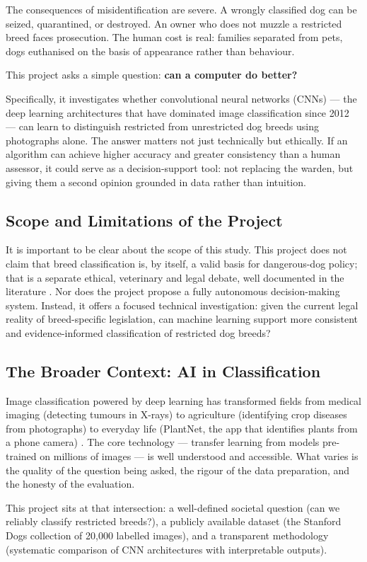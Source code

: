 The consequences of misidentification are severe. A wrongly classified dog can be seized, quarantined, or destroyed. An owner who does not muzzle a restricted breed faces prosecution. The human cost is real: families separated from pets, dogs euthanised on the basis of appearance rather than behaviour.

This project asks a simple question: \textbf{can a computer do better?}

Specifically, it investigates whether convolutional neural networks (CNNs) --- the deep learning architectures that have dominated image classification since 2012 --- can learn to distinguish restricted from unrestricted dog breeds using photographs alone. The answer matters not just technically but ethically. If an algorithm can achieve higher accuracy and greater consistency than a human assessor, it could serve as a decision-support tool: not replacing the warden, but giving them a second opinion grounded in data rather than intuition.

\subsection{Scope and Limitations of the Project}

It is important to be clear about the scope of this study. This project does not claim that breed classification is, by itself, a valid basis for dangerous-dog policy; that is a separate ethical, veterinary and legal debate, well documented in the literature \citep{clarke2018}. Nor does the project propose a fully autonomous decision-making system. Instead, it offers a focused technical investigation: given the current legal reality of breed-specific legislation, can machine learning support more consistent and evidence-informed classification of restricted dog breeds?


\subsection{The Broader Context: AI in Classification}

Image classification powered by deep learning has transformed fields from medical imaging (detecting tumours in X-rays) to agriculture (identifying crop diseases from photographs) to everyday life (PlantNet, the app that identifies plants from a phone camera) \citep{PlantNet2025}. The core technology --- transfer learning from models pre-trained on millions of images --- is well understood and accessible. What varies is the quality of the question being asked, the rigour of the data preparation, and the honesty of the evaluation.

This project sits at that intersection: a well-defined societal question (can we reliably classify restricted breeds?), a publicly available dataset (the Stanford Dogs collection of 20,000 labelled images), and a transparent methodology (systematic comparison of CNN architectures with interpretable outputs).
